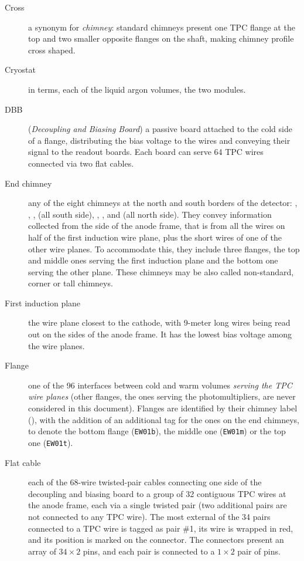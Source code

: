 \begin{description}
  \item[Cross]
    a synonym for \emph{chimney}: standard chimneys present one TPC flange at
    the top and two smaller opposite flanges on the shaft, making chimney
    profile cross shaped.

  \item[Cryostat]
    in \LArSoft terms, each of the liquid argon volumes, \ie the
    two modules.

  \item[DBB] (\emph{Decoupling and Biasing Board})
    a passive board attached
    to the cold side of a flange, distributing the bias voltage to the wires
    and conveying their signal to the readout boards. Each board can serve
    64 TPC wires connected via two flat cables.

  \item[End chimney]
    any of the eight chimneys at the north and south borders of the detector:
    , , ,  (all south side),
    , ,  and  (all north side).
    They convey information collected from the side of the anode frame, that is
    from all the wires on half of the first induction wire plane,
    plus the short wires of one of the other wire planes.
    To accommodate this, they include three flanges, the top and middle ones
    serving the first induction plane and the bottom one serving the other plane.
    These chimneys may be also called non-standard, corner or tall chimneys.

  \item[First induction plane]
    the wire plane closest to the cathode,
    with 9-meter long wires being read out on the sides of the anode frame.
    It has the lowest bias voltage among the wire planes.

  \item[Flange]
    one of the 96 interfaces between cold and warm volumes
    \emph{serving the TPC wire planes}
    (other flanges, \eg the ones serving the photomultipliers, are never
    considered in this document).
    Flanges are identified by their chimney label (\eg {}), with the
    addition of an additional tag for the ones on the end chimneys,
    to denote the bottom flange (\texttt{EW01b}),
    the middle one (\texttt{EW01m}) or the top one (\texttt{EW01t}).

  \item[Flat cable]
    each of the 68-wire twisted-pair cables connecting one side
    of the decoupling and biasing board to a group of 32 contiguous TPC wires
    at the anode frame, each via a single twisted pair (two additional pairs are
    not connected to any TPC wire). The most external of the 34 pairs connected
    to a TPC wire is tagged as pair \#1, its wire is wrapped in red, and its
    position is marked on the connector. The connectors present an array of
    $34 \times 2$ pins, and each pair is connected to a $1 \times 2$ pair of
    pins.


\end{description}
